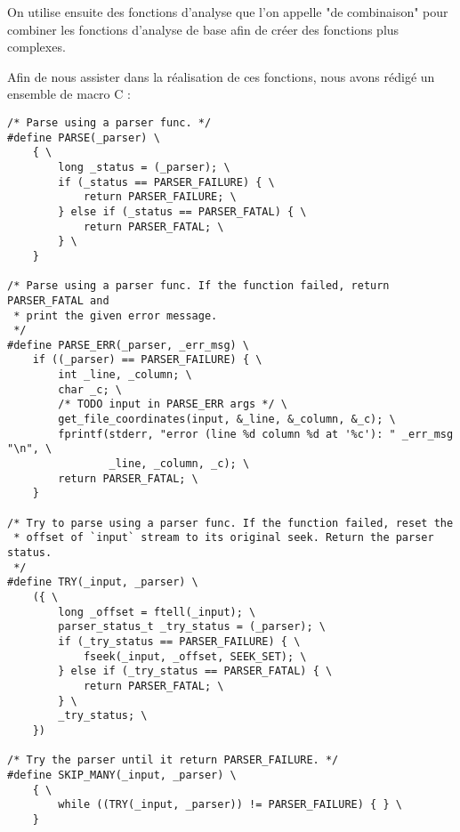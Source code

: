 On utilise ensuite des fonctions d'analyse que l'on appelle "de combinaison"
pour combiner les fonctions d'analyse de base afin de créer des fonctions plus
complexes.

Afin de nous assister dans la réalisation de ces fonctions, nous avons rédigé
un ensemble de macro C :
\begin{verbatim}
/* Parse using a parser func. */
#define PARSE(_parser) \
    { \
        long _status = (_parser); \
        if (_status == PARSER_FAILURE) { \
            return PARSER_FAILURE; \
        } else if (_status == PARSER_FATAL) { \
            return PARSER_FATAL; \
        } \
    }

/* Parse using a parser func. If the function failed, return PARSER_FATAL and
 * print the given error message.
 */
#define PARSE_ERR(_parser, _err_msg) \
    if ((_parser) == PARSER_FAILURE) { \
        int _line, _column; \
        char _c; \
        /* TODO input in PARSE_ERR args */ \
        get_file_coordinates(input, &_line, &_column, &_c); \
        fprintf(stderr, "error (line %d column %d at '%c'): " _err_msg "\n", \
                _line, _column, _c); \
        return PARSER_FATAL; \
    }

/* Try to parse using a parser func. If the function failed, reset the
 * offset of `input` stream to its original seek. Return the parser status.
 */
#define TRY(_input, _parser) \
    ({ \
        long _offset = ftell(_input); \
        parser_status_t _try_status = (_parser); \
        if (_try_status == PARSER_FAILURE) { \
            fseek(_input, _offset, SEEK_SET); \
        } else if (_try_status == PARSER_FATAL) { \
            return PARSER_FATAL; \
        } \
        _try_status; \
    })

/* Try the parser until it return PARSER_FAILURE. */
#define SKIP_MANY(_input, _parser) \
    { \
        while ((TRY(_input, _parser)) != PARSER_FAILURE) { } \
    }
\end{verbatim}

